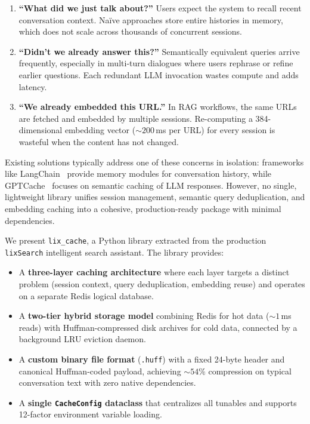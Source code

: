 \documentclass[conference]{IEEEtran}
\begin{document}
\begin{enumerate}
\item \textbf{``What did we just talk about?''} Users expect the system to recall recent conversation context. Na\"ive approaches store entire histories in memory, which does not scale across thousands of concurrent sessions.

\item \textbf{``Didn't we already answer this?''} Semantically equivalent queries arrive frequently, especially in multi-turn dialogues where users rephrase or refine earlier questions. Each redundant LLM invocation wastes compute and adds latency.

\item \textbf{``We already embedded this URL.''} In RAG workflows, the same URLs are fetched and embedded by multiple sessions. Re-computing a 384-dimensional embedding vector (${\sim}200$\,ms per URL) for every session is wasteful when the content has not changed.
\end{enumerate}

Existing solutions typically address one of these concerns in isolation: frameworks like LangChain~\cite{langchain2023} provide memory modules for conversation history, while GPTCache~\cite{gptcache2023} focuses on semantic caching of LLM responses. However, no single, lightweight library unifies session management, semantic query deduplication, and embedding caching into a cohesive, production-ready package with minimal dependencies.

We present \texttt{lix\_cache}, a Python library extracted from the production \texttt{lixSearch} intelligent search assistant. The library provides:

\begin{itemize}
\item A \textbf{three-layer caching architecture} where each layer targets a distinct problem (session context, query deduplication, embedding reuse) and operates on a separate Redis logical database.
\item A \textbf{two-tier hybrid storage model} combining Redis for hot data (${\sim}1$\,ms reads) with Huffman-compressed disk archives for cold data, connected by a background LRU eviction daemon.
\item A \textbf{custom binary file format} (\texttt{.huff}) with a fixed 24-byte header and canonical Huffman-coded payload, achieving ${\sim}54\%$ compression on typical conversation text with zero native dependencies.
\item A \textbf{single \texttt{CacheConfig} dataclass} that centralizes all tunables and supports 12-factor environment variable loading.
\end{itemize}
\end{document}
